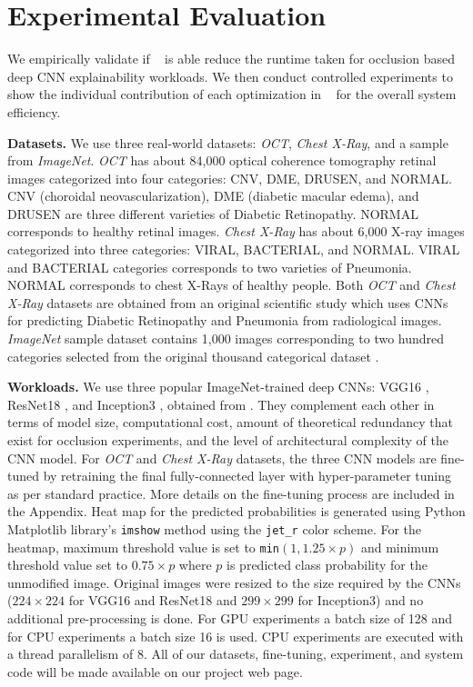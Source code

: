 \section{Experimental Evaluation}
We empirically validate if \system~ is able reduce the runtime taken for occlusion based deep CNN explainability workloads.
We then conduct controlled experiments to show the individual contribution of each optimization in \system~ for the overall system efficiency.

\vspace{2mm}
\noindent \textbf{Datasets.}
We use three real-world datasets: \textit{OCT}, \textit{Chest X-Ray}, and a sample from \textit{ImageNet}. \textit{OCT} has about 84,000 optical coherence tomography retinal images categorized into four categories: CNV, DME, DRUSEN, and NORMAL. CNV (choroidal neovascularization), DME (diabetic macular edema), and DRUSEN are three different varieties of Diabetic Retinopathy. NORMAL corresponds to healthy retinal images. \textit{Chest X-Ray} has about 6,000 X-ray images categorized into three categories: VIRAL, BACTERIAL, and NORMAL.
VIRAL and BACTERIAL categories corresponds to two varieties of Pneumonia. NORMAL corresponds to chest X-Rays of healthy people. Both \textit{OCT} and \textit{Chest X-Ray} datasets are obtained from an original scientific study \cite{kermany2018identifying} which uses CNNs for predicting Diabetic Retinopathy and Pneumonia from radiological images. \textit{ImageNet} sample dataset contains 1,000 images corresponding to two hundred categories selected from the original thousand categorical dataset \cite{deng2009imagenet}.

\vspace{2mm}
\noindent \textbf{Workloads.}
We use three popular ImageNet-trained deep CNNs: VGG16 \cite{vggnet}, ResNet18 \cite{resnet}, and Inception3 \cite{inception}, obtained from \cite{torchvisionmodels}. They complement each other in terms of model size, computational cost, amount of theoretical redundancy that exist for occlusion experiments, and the level of architectural complexity of the CNN model. For \textit{OCT} and \textit{Chest X-Ray} datasets, the three CNN models are fine-tuned by retraining the final fully-connected layer with hyper-parameter tuning as per standard practice. More details on the fine-tuning process are included in the Appendix. Heat map for the predicted probabilities is generated using Python Matplotlib library's \texttt{imshow} method using the \texttt{jet\_r} color scheme. For the heatmap, maximum threshold value is set to \texttt{min}$(1, 1.25 \times p)$ and minimum threshold value set to $0.75 \times p$ where $p$ is predicted class probability for the unmodified image. Original images were resized to the size required by the CNNs ($224\times224$ for VGG16 and ResNet18 and $299\times299$ for Inception3) and no additional pre-processing is done. For GPU experiments a batch size of 128 and for CPU experiments a batch size 16 is used. CPU experiments are executed with a thread parallelism of 8.
All of our datasets, fine-tuning, experiment, and system code will be made available on our project web page.

